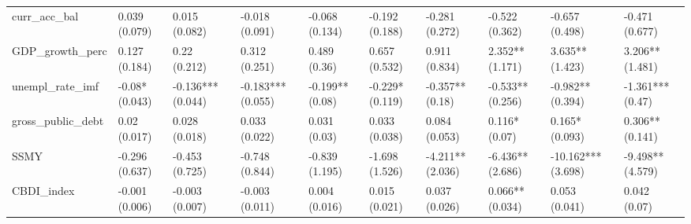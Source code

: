 \begin{table}[ht]
\begin{tabular}{llllllllll}
  curr\_acc\_bal & 0.039 (0.079) & 0.015 (0.082) & -0.018 (0.091) & -0.068 (0.134) & -0.192 (0.188) & -0.281 (0.272) & -0.522 (0.362) & -0.657 (0.498) & -0.471 (0.677) \\ 
  GDP\_growth\_perc & 0.127 (0.184) & 0.22 (0.212) & 0.312 (0.251) & 0.489 (0.36) & 0.657 (0.532) & 0.911 (0.834) & 2.352** (1.171) & 3.635** (1.423) & 3.206** (1.481) \\ 
  unempl\_rate\_imf & -0.08* (0.043) & -0.136*** (0.044) & -0.183*** (0.055) & -0.199** (0.08) & -0.229* (0.119) & -0.357** (0.18) & -0.533** (0.256) & -0.982** (0.394) & -1.361*** (0.47) \\ 
  gross\_public\_debt & 0.02 (0.017) & 0.028 (0.018) & 0.033 (0.022) & 0.031 (0.03) & 0.033 (0.038) & 0.084 (0.053) & 0.116* (0.07) & 0.165* (0.093) & 0.306** (0.141) \\ 
  SSMY & -0.296 (0.637) & -0.453 (0.725) & -0.748 (0.844) & -0.839 (1.195) & -1.698 (1.526) & -4.211** (2.036) & -6.436** (2.686) & -10.162*** (3.698) & -9.498** (4.579) \\ 
  CBDI\_index & -0.001 (0.006) & -0.003 (0.007) & -0.003 (0.011) & 0.004 (0.016) & 0.015 (0.021) & 0.037 (0.026) & 0.066** (0.034) & 0.053 (0.041) & 0.042 (0.07) \\ 
   \bottomrule
\end{tabular}
\endgroup
\end{table}
